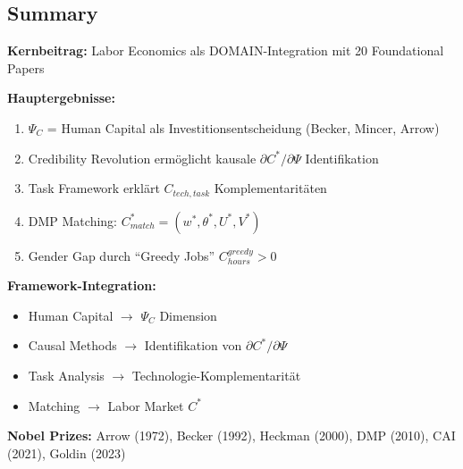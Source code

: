 \subsection{Summary}
\label{sec:aa-summary}

\begin{tcolorbox}[colback=green!5!white, colframe=green!75!black, title=\textbf{Appendix MUL1 Summary}]
\textbf{Kernbeitrag:} Labor Economics als DOMAIN-Integration mit 20 Foundational Papers

\textbf{Hauptergebnisse:}
\begin{enumerate}[noitemsep]
    \item $\Psi_C$ = Human Capital als Investitionsentscheidung (Becker, Mincer, Arrow)
    \item Credibility Revolution ermöglicht kausale $\partial C^*/\partial \Psi$ Identifikation
    \item Task Framework erklärt $C_{tech, task}$ Komplementaritäten
    \item DMP Matching: $C^*_{match} = (w^*, \theta^*, U^*, V^*)$
    \item Gender Gap durch ``Greedy Jobs'' $C_{hours}^{greedy} > 0$
\end{enumerate}

\textbf{Framework-Integration:}
\begin{itemize}[noitemsep]
    \item Human Capital $\to$ $\Psi_C$ Dimension
    \item Causal Methods $\to$ Identifikation von $\partial C^*/\partial \Psi$
    \item Task Analysis $\to$ Technologie-Komplementarität
    \item Matching $\to$ Labor Market $C^*$
\end{itemize}

\textbf{Nobel Prizes:} Arrow (1972), Becker (1992), Heckman (2000), DMP (2010), CAI (2021), Goldin (2023)
\end{tcolorbox}

